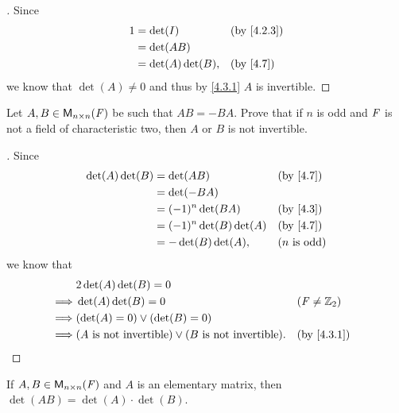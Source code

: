 \begin{proof}[]
  Since
  \begin{align*}
    1 & = \det(I)          &  & \text{(by \cref{4.2.3})} \\
      & = \det(AB)                                       \\
      & = \det(A) \det(B), &  & \text{(by \cref{4.7})}
  \end{align*}
  we know that \(\det(A) \neq 0\) and thus by \cref{4.3.1} \(A\) is invertible.
\end{proof}

\begin{ex}\label{ex:4.3.17}
  Let \(A, B \in \mathsf{M}_{{n} \times n}({\mathit{F}})\) be such that \(AB = -BA\).
  Prove that if \(n\) is odd and \(\mathit{F}\) is not a field of characteristic two, then \(A\) or \(B\) is not invertible.
\end{ex}

\begin{proof}[]
  Since
  \begin{align*}
    \det(A) \det(B) & = \det(AB)               &  & \text{(by \cref{4.7})} \\
                    & = \det(-BA)                                          \\
                    & = (-1)^n \det(BA)        &  & \text{(by \cref{4.3})} \\
                    & = (-1)^n \det(B) \det(A) &  & \text{(by \cref{4.7})} \\
                    & = -\det(B) \det(A),      &  & \text{(\(n\) is odd)}
  \end{align*}
  we know that
  \begin{align*}
             & 2 \det(A) \det(B) = 0                                                                           \\
    \implies & \det(A) \det(B) = 0                                               &  & (\F \neq \Z_2)           \\
    \implies & (\det(A) = 0) \lor (\det(B) = 0)                                                                \\
    \implies & (A \text{ is not invertible}) \lor (B \text{ is not invertible}). &  & \text{(by \cref{4.3.1})}
  \end{align*}
\end{proof}

\begin{ex}\label{ex:4.3.18}
  If \(A, B \in \mathsf{M}_{{n} \times n}({\mathit{F}})\) and \(A\) is an elementary matrix, then \(\det(AB) = \det(A) \cdot \det(B)\).
\end{ex}

